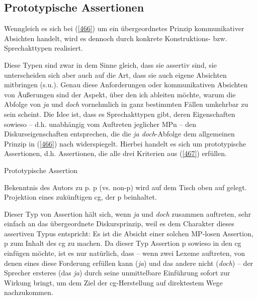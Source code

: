 \subsection{Prototypische Assertionen}
Wenngleich es sich bei (\ref{466}) um ein übergeordnetes Prinzip kommunikativer Absichten handelt, wird es dennoch durch konkrete Konstruktions- bzw. Sprechakttypen  realisiert.

Diese Typen sind zwar in dem Sinne gleich, dass sie assertiv  sind, sie unterscheiden sich aber auch auf die Art, dass sie auch eigene Absichten mitbringen (s.u.). Genau diese Anforderungen oder kommunikativen Absichten von Äußerungen sind der Aspekt, über den ich ableiten möchte, warum die Abfolge von \textit{ja} und \textit{doch} vornehmlich in ganz bestimmten Fällen umkehrbar zu sein scheint. Die Idee ist, dass es Sprechakttypen gibt, deren Eigenschaften sowieso – d.h. unabhängig vom Auftreten jeglicher MPn – den Diskurseigenschaften entsprechen, die die \textit{ja doch}-Abfolge dem allgemeinen Prinzip in (\ref{466}) nach widerspiegelt. Hierbei handelt es sich  um prototypische Assertionen, d.h. Assertionen, die alle drei Kriterien aus (\ref{467}) erfüllen.

\begin{exe}
	\ex\label{467} Prototypische Assertion
 		\begin{xlist}
			\ex\label{467a} Bekenntnis des Autors zu p.
 			\ex\label{467b}	p (vs. non-p) wird auf dem Tisch oben auf gelegt.
 			\ex\label{467c}	Projektion eines zukünftigen cg, der p beinhaltet.
 		\end{xlist}			
 		\hfill\hbox{\citet[92]{Farkas2010}}
\end{exe}
Dieser Typ von Assertion hält sich, wenn \textit{ja} und \textit{doch} zusammen auftreten, sehr einfach an das übergeordnete Diskursprinzip, weil es dem Charakter dieses assertiven Typus entspricht: Es ist die Absicht einer solchen MP-losen Assertion, p zum Inhalt des cg zu machen. Da dieser Typ Assertion p sowieso in den cg einfügen möchte, ist es nur natürlich, dass – wenn zwei Lexeme auftreten, von denen eines diese Forderung erfüllen kann (\textit{ja}) und das andere nicht (\textit{doch}) – der Sprecher ersteres (das \textit{ja}) durch seine unmittelbare Einführung sofort zur Wirkung bringt, um dem Ziel der cg-Herstellung auf direktestem Wege nach\-zukommen.

